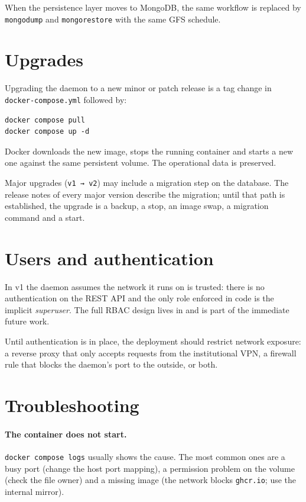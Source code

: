 When the persistence layer moves to MongoDB, the same workflow is
replaced by \texttt{mongodump} and \texttt{mongorestore} with
the same GFS schedule.

\section{Upgrades}

Upgrading the daemon to a new minor or patch release is a tag
change in \texttt{docker-compose.yml} followed by:

\begin{verbatim}
docker compose pull
docker compose up -d
\end{verbatim}

Docker downloads the new image, stops the running container and
starts a new one against the same persistent volume. The
operational data is preserved.

Major upgrades (\texttt{v1 → v2}) may include a migration step on
the database. The release notes of every major version describe
the migration; until that path is established, the upgrade is a
backup, a stop, an image swap, a migration command and a start.

\section{Users and authentication}

In v1 the daemon assumes the network it runs on is trusted: there
is no authentication on the REST API and the only role enforced in
code is the implicit \emph{superuser}. The full RBAC design lives
in  and is part of the immediate future work.

Until authentication is in place, the deployment should restrict
network exposure: a reverse proxy that only accepts requests from
the institutional VPN, a firewall rule that blocks the daemon's
port to the outside, or both.

\section{Troubleshooting}

\paragraph{The container does not start.}
\texttt{docker compose logs} usually shows the cause. The most
common ones are a busy port (change the host port mapping), a
permission problem on the volume (check the file owner) and a
missing image (the network blocks \texttt{ghcr.io}; use the
internal mirror).


